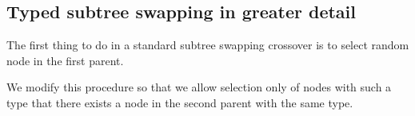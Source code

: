 \documentclass{sig-alternate}
\begin{document}






\subsection{Typed subtree swapping in greater detail}
\label{typed-swapping}



The first thing to do in a standard subtree swapping crossover is to select random node in the first parent. 

We modify this procedure so that we allow selection only of nodes with such a type that there exists a node in the second parent with the same type.
\end{document}
